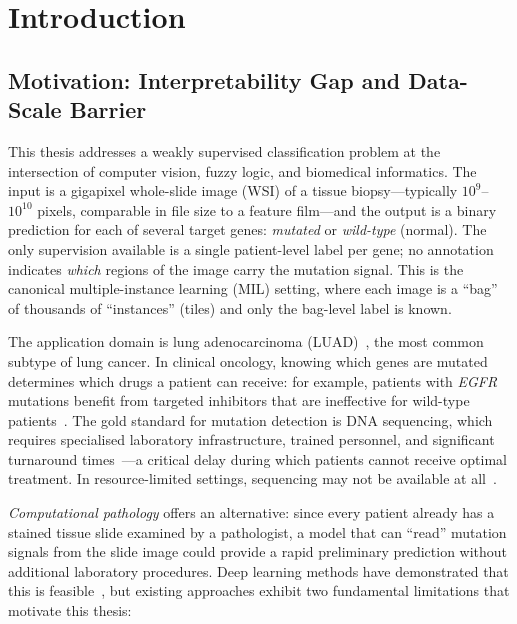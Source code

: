 \chapter{Introduction}
\label{ch:introduction}

\section{Motivation: Interpretability Gap and Data-Scale Barrier}
\label{sec:intro:motivation}

This thesis addresses a weakly supervised classification problem at
the intersection of computer vision, fuzzy logic, and biomedical
informatics.
The input is a gigapixel whole-slide image (WSI) of a tissue
biopsy---typically $10^9$--$10^{10}$ pixels, comparable in file size
to a feature film---and the output is a binary prediction for each of
several target genes: \emph{mutated} or \emph{wild-type} (normal).
The only supervision available is a single patient-level label per
gene; no annotation indicates \emph{which} regions of the image carry
the mutation signal.
This is the canonical multiple-instance learning (MIL) setting,
where each image is a ``bag'' of thousands of ``instances'' (tiles)
and only the bag-level label is known.

The application domain is lung adenocarcinoma
(LUAD)~\cite{sung2021global}, the most common subtype of lung
cancer.
In clinical oncology, knowing which genes are mutated determines
which drugs a patient can receive: for example, patients with
\emph{EGFR} mutations benefit from targeted inhibitors that are
ineffective for wild-type patients~\cite{herbst2018lung}.
The gold standard for mutation detection is DNA sequencing, which
requires specialised laboratory infrastructure, trained personnel,
and significant turnaround
times~\cite{vanderlaan2018molecular}---a critical delay during which
patients cannot receive optimal treatment.
In resource-limited settings, sequencing may not be available at
all~\cite{sung2021global}.

\emph{Computational pathology} offers an alternative: since every
patient already has a stained tissue slide examined by a pathologist,
a model that can ``read'' mutation signals from the slide image could
provide a rapid preliminary prediction without additional laboratory
procedures.
Deep learning methods have demonstrated that this is
feasible~\cite{coudray2018classification, kather2020pancancer,
saldanha2023npj}, but existing approaches exhibit two fundamental
limitations that motivate this thesis:

